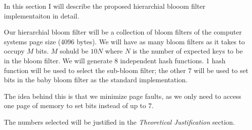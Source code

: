 In this section I will describe the proposed hierarchial blooom filter implementaiton in detail.

Our hierarchial bloom filter will be a collection of bloom filters of the computer systems page size (4096 bytes).
We will have as many bloom filters as it takes to occupy $M$ bits. $M$ sohuld be $10N$ where $N$ is the number of expected keys to be in the bloom filter.
We will generate $8$ independent hash functions. 1 hash function will be used to select the sub-bloom filter; the other $7$ will be used to set bits in the baby bloom filter as the standard implementation.

The idea behind this is that we minimize page faults, as we only need to access one page of memory to set bits instead of up to $7$.

The numbers selected will be justified in the \textit{Theoretical Justification} section.